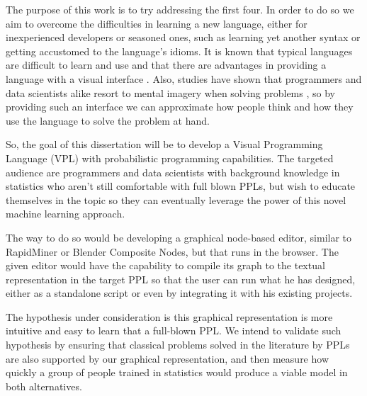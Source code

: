 The purpose of this work is to try addressing the first four. In order to do so we
aim to overcome the difficulties in learning a new language, either for
inexperienced developers or seasoned ones, such as learning yet another syntax
or getting accustomed to the language's idioms. It is known that typical
languages are difficult to learn and use \cite{Lewis1987} and that there are
advantages in providing a language with a visual interface \cite{dfbeg}. Also,
studies have shown that programmers and data scientists alike resort to mental
imagery when solving problems \cite{Dastani2002}\cite{Petre1999}, so by
providing such an interface we can approximate how people think and how they
use the language to solve the problem at hand.

So, the goal of this dissertation will be to develop a Visual Programming
Language (VPL) with probabilistic programming capabilities. The targeted
audience are programmers and data scientists with background knowledge in
statistics who aren't still comfortable
with full blown PPLs, but wish to educate themselves in the topic so they can
eventually leverage the power of this novel machine learning approach.

The way to do so would be developing a graphical node-based editor, similar to
RapidMiner or Blender Composite Nodes, but that runs in the browser. The given
editor would have the capability to compile its graph to the textual
representation in the target PPL so that the user can run what he has designed,
either as a standalone script or even by integrating it with his existing
projects.

The hypothesis under consideration is this graphical representation
is more intuitive and easy to learn that a full-blown PPL.
We intend to validate such hypothesis by ensuring that classical problems solved
in the literature by PPLs are also supported by our graphical representation,
and then measure how quickly a group of people trained in statistics would
produce a viable model in both alternatives.
